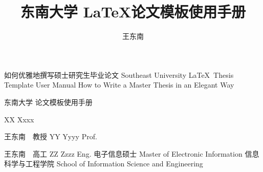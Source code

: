 \documentclass[algorithmlist,figurelist,tablelist,nomlist,engineer]{template/seumasterthesis}
\begin{document}

\title
    {东南大学 \LaTeX 论文模板使用手册}        %
    {如何优雅地撰写硕士研究生毕业论文}         %
    {Southeast University \LaTeX ~Thesis Template User Manual}  %
    {How to Write a Master Thesis in an Elegant Way}            %

\spine
    {东南大学  论文模板使用手册} 
    {}                                                               

\author
    {王东南}                        %
    {XX Xxxx}                  %

\advisor
    {王东南　教授}                %
    {YY Yyyy}        %
    {Prof.}                     %
    
\coadvisor                 %
    {王东南　高工}                  %
    {ZZ Zzzz}             %
    {Eng.}                 %
\degreetype                        %
    {电子信息硕士}
    {Master of Electronic Information}
\authorizedate{}                  %
\committeechair{}               %
\reviewer{}{}            %
\department                        %
    {信息科学与工程学院}
    {School of Information Science and Engineering}
\end{document}

